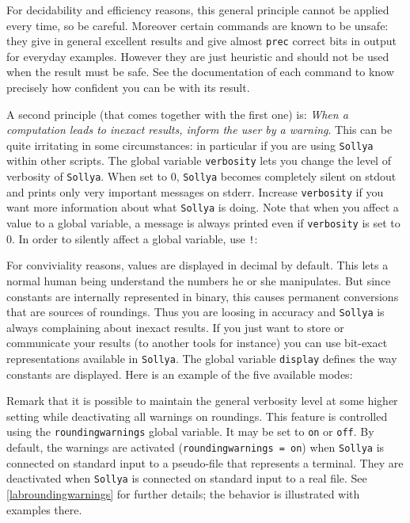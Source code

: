 \documentclass[a4paper]{article}
\newcommand{\com}[1]{\texttt{#1}}
\newcommand{\key}[1]{\texttt{#1}}
\newcommand{\sollya}{\texttt{Sollya}\xspace}
\begin{document}
For decidability and efficiency reasons, this general principle cannot be applied every time, so be careful. Moreover certain commands are known to be unsafe: they give in general excellent results and give almost \key{prec} correct bits in output for everyday examples. However they are just heuristic and should not be used when the result must be safe. See the documentation of each command to know precisely how confident you can be with its result.

A second principle (that comes together with the first one) is: \emph{When a computation leads to inexact results, inform the user by a warning}. This can be quite irritating in some circumstances: in particular if you are using \sollya within other scripts. The global variable \key{verbosity} lets you change the level of verbosity of \sollya. When set to $0$, \sollya becomes completely silent on stdout and prints only very important messages on stderr. Increase \key{verbosity} if you want more information about what \sollya is doing. Note that when you affect a value to a global variable, a message is always printed even if \com{verbosity} is set to $0$. In order to silently affect a global variable, use \texttt{!}:



For conviviality reasons, values are displayed in decimal by default. This lets a normal human being understand the numbers he or she manipulates. But since constants are internally represented in binary, this causes permanent conversions that are sources of roundings. Thus you are loosing in accuracy and \sollya is always complaining about inexact results. If you just want to store or communicate your results (to another tools for instance) you can use bit-exact representations available in \sollya. The global variable \key{display} defines the way constants are displayed. Here is an example of the five available modes:



Remark that it is possible to maintain the general verbosity level at
some higher setting while deactivating all warnings on roundings. This
feature is controlled using the \key{roundingwarnings} global
variable. It may be set to \key{on} or \key{off}. By default, the
warnings are activated (\key{roundingwarnings = on}) when \sollya is
connected on standard input to a pseudo-file that represents a
terminal. They are deactivated when \sollya is connected on standard
input to a real file. See \ref{labroundingwarnings} for further details; the behavior is
illustrated with examples there.
\end{document}
